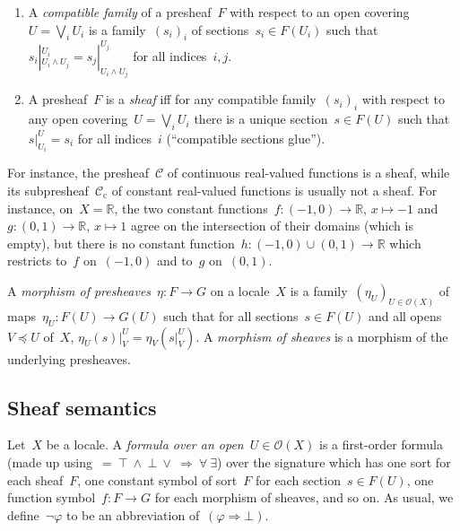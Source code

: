 \documentclass{ws-rv9x6}
\newcommand{\C}{\mathcal{C}}
\renewcommand{\O}{\mathcal{O}}
\newcommand{\RR}{\mathbb{R}}
\renewcommand{\_}{\mathpunct{.}}
\newcommand{\?}{\,{:}\,}
\begin{document}
\begin{definition}
\begin{enumerate}
\item A \emph{compatible family} of a presheaf~$F$ with respect to an open
covering~$U = \bigvee_i U_i$ is a family~$(s_i)_i$ of sections~$s_i \in F(U_i)$
such that~$s_i|^{U_i}_{U_i \wedge U_j} = s_j|^{U_j}_{U_i \wedge U_j}$ for all
indices~$i,j$.
\item A presheaf~$F$ is a \emph{sheaf}
iff for any compatible family~$(s_i)_i$ with respect to any open covering~$U =
\bigvee_i U_i$ there is a unique section~$s \in F(U)$ such
that~$s|^U_{U_i} = s_i$ for all indices~$i$ (``compatible sections glue'').
\end{enumerate}
\end{definition}

For instance, the presheaf~$\C$ of continuous real-valued functions is a sheaf,
while its subpresheaf~$\C_\text{c}$ of constant real-valued functions is
usually not a sheaf. For instance, on~$X = \RR$, the two constant functions~$f
: (-1,0) \to \RR,\,x \mapsto -1$ and~$g : (0,1) \to \RR,\,x \mapsto 1$ agree on
the intersection of their domains (which is empty), but there is no constant
function~$h : (-1,0) \cup (0,1) \to \RR$ which restricts to~$f$ on~$(-1,0)$ and
to~$g$ on~$(0,1)$.

\begin{definition}A \emph{morphism of presheaves}~$\eta : F \to G$ on a
locale~$X$ is a family~$(\eta_U)_{U \in \O(X)}$ of maps~$\eta_U : F(U) \to
G(U)$ such that for all sections~$s \in F(U)$ and all opens~$V \preceq U$
of~$X$, $\eta_U(s)|^U_V = \eta_V(s|^U_V)$. A \emph{morphism of sheaves} is a
morphism of the underlying presheaves.
\end{definition}


\subsection{Sheaf semantics}


Let~$X$ be a locale. A \emph{formula over an open~$U \in \O(X)$} is a
first-order formula (made up using~${=}\ {\top}\ {\wedge}\ {\bot}\ {\vee}\
{\Rightarrow}\ {\forall}\ {\exists}$) over the signature which has one sort for
each sheaf~$F$, one constant symbol of sort~$F$ for each section~$s \in F(U)$,
one function symbol~$f : F \to G$ for each morphism of sheaves, and so on. As
usual, we define~$\neg\varphi$ to be an abbreviation of~$(\varphi \Rightarrow
\bot)$.
\end{document}
